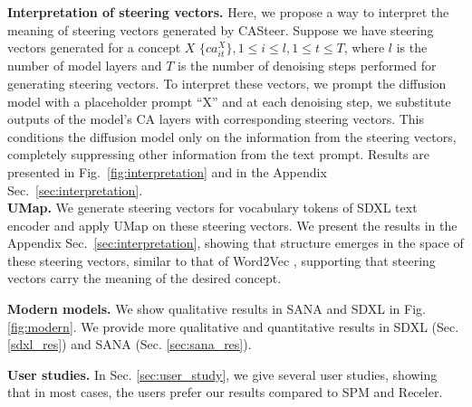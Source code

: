 \noindent \textbf{Interpretation of steering vectors.} %
Here, we propose a way to interpret the meaning of steering vectors generated by CASteer. Suppose we have steering vectors generated for a concept $X$ $\{ca^{X}_{it}\}, 1 \leqslant i \leqslant l, 1 \leqslant t \leqslant T$, where $l$ is the number of model layers and $T$ is the number of denoising steps performed for generating steering vectors. To interpret these vectors, we prompt the diffusion model with a placeholder prompt ``X'' and at each denoising step, we substitute outputs of the model's CA layers with corresponding steering vectors. This conditions the diffusion model only on the information from the steering vectors, completely suppressing other information from the text prompt. Results are presented in Fig.~\ref{fig:interpretation} and in the Appendix Sec.~\ref{sec:interpretation}.  \\
\noindent \textbf{UMap.} We  generate steering vectors for vocabulary tokens of SDXL text encoder and apply UMap \cite{DBLP:journals/corr/abs-1802-03426} on these steering vectors. We present the results in the Appendix Sec.~\ref{sec:interpretation}, showing that structure emerges in the space of these steering vectors, similar to that of Word2Vec \cite{DBLP:journals/corr/abs-1301-3781}, supporting that steering vectors carry the meaning of the desired concept. 

\noindent \textbf{Modern models.} We show qualitative results in SANA and SDXL in Fig. \ref{fig:modern}. We provide more qualitative and quantitative results in  SDXL (Sec. \ref{sdxl_res}) and SANA (Sec. \ref{sec:sana_res}).

\noindent \textbf{User studies.} In Sec. \ref{sec:user_study}, we give several user studies, showing that in most cases, the users prefer our results compared to SPM and Receler.





